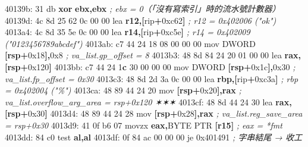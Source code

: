 \documentclass[10pt,a4paper]{article}
\newenvironment{Shaded}{\begin{snugshade}}{\end{snugshade}}
\newcommand{\BaseNTok}[1]{\textcolor[rgb]{0.00,0.00,0.81}{#1}}
\newcommand{\BuiltInTok}[1]{#1}
\newcommand{\CommentTok}[1]{\textcolor[rgb]{0.56,0.35,0.01}{\textit{#1}}}
\newcommand{\DataTypeTok}[1]{\textcolor[rgb]{0.13,0.29,0.53}{#1}}
\newcommand{\DecValTok}[1]{\textcolor[rgb]{0.00,0.00,0.81}{#1}}
\newcommand{\ErrorTok}[1]{\textcolor[rgb]{0.64,0.00,0.00}{\textbf{#1}}}
\newcommand{\KeywordTok}[1]{\textcolor[rgb]{0.13,0.29,0.53}{\textbf{#1}}}
\newcommand{\NormalTok}[1]{#1}
\newcommand{\OperatorTok}[1]{\textcolor[rgb]{0.81,0.36,0.00}{\textbf{#1}}}
\renewenvironment{Shaded}{%
  \def\FrameCommand{\fboxsep=3.2pt\colorbox{shadecolor}}%
  \MakeFramed{\advance\hsize-\width\FrameRestore\small}%
}{%
  \endMakeFramed
}
\begin{document}
\begin{Shaded}
\begin{Highlighting}[]
\NormalTok{  40139b: 31 }\DataTypeTok{db}              \OperatorTok{xor}  \KeywordTok{ebx}\OperatorTok{,}\KeywordTok{ebx}        \CommentTok{; ebx = 0（「沒有寫索引」時的流水號計數器）}
\NormalTok{  40139d: 4c 8d 25 62 0c 00 00  }\BuiltInTok{lea} \KeywordTok{r12}\OperatorTok{,[}\NormalTok{rip}\OperatorTok{+}\BaseNTok{0xc62}\OperatorTok{]}  \CommentTok{; r12 = 0x402006 ("ok")}
\NormalTok{  4013a4: 4c 8d 35 5e 0c 00 00  }\BuiltInTok{lea} \KeywordTok{r14}\OperatorTok{,[}\NormalTok{rip}\OperatorTok{+}\BaseNTok{0xc5e}\OperatorTok{]}  \CommentTok{; r14 = 0x402009 ("0123456789abcdef")}
\NormalTok{  4013ab: c7 }\DecValTok{44} \DecValTok{24} \DecValTok{18} \DecValTok{08} \DecValTok{00} \DecValTok{00} \DecValTok{00}\NormalTok{  mov }\DataTypeTok{DWORD} \OperatorTok{[}\KeywordTok{rsp}\OperatorTok{+}\BaseNTok{0x18}\OperatorTok{],}\BaseNTok{0x8}   \CommentTok{; va\_list.gp\_offset   = 8}
\NormalTok{  4013b3: 48 8d 84 24 20 01 00 00  }\BuiltInTok{lea} \KeywordTok{rax}\OperatorTok{,[}\KeywordTok{rsp}\OperatorTok{+}\BaseNTok{0x120}\OperatorTok{]}
\NormalTok{  4013bb: c7 }\DecValTok{44} \DecValTok{24} \DecValTok{1}\ErrorTok{c} \DecValTok{30} \DecValTok{00} \DecValTok{00} \DecValTok{00}\NormalTok{  mov }\DataTypeTok{DWORD} \OperatorTok{[}\KeywordTok{rsp}\OperatorTok{+}\BaseNTok{0x1c}\OperatorTok{],}\BaseNTok{0x30}  \CommentTok{; va\_list.fp\_offset   = 0x30}
\NormalTok{  4013c3: 48 8d 2d 3a 0c 00 00  }\BuiltInTok{lea} \KeywordTok{rbp}\OperatorTok{,[}\NormalTok{rip}\OperatorTok{+}\BaseNTok{0xc3a}\OperatorTok{]}  \CommentTok{; rbp = 0x402004 ("\%")}
\NormalTok{  4013ca: 48 89 44 24 20     }\BuiltInTok{mov}  \OperatorTok{[}\KeywordTok{rsp}\OperatorTok{+}\BaseNTok{0x20}\OperatorTok{],}\KeywordTok{rax}  \CommentTok{; va\_list.overflow\_arg\_area = rsp+0x120  ✶✶✶}
\NormalTok{  4013cf: 48 8d 44 24 30     }\BuiltInTok{lea}  \KeywordTok{rax}\OperatorTok{,[}\KeywordTok{rsp}\OperatorTok{+}\BaseNTok{0x30}\OperatorTok{]}
\NormalTok{  4013d4: 48 89 44 24 28     }\BuiltInTok{mov}  \OperatorTok{[}\KeywordTok{rsp}\OperatorTok{+}\BaseNTok{0x28}\OperatorTok{],}\KeywordTok{rax}  \CommentTok{; va\_list.reg\_save\_area     = rsp+0x30}
\NormalTok{  4013d9: 41 0f b6 }\DecValTok{07}\NormalTok{        movzx }\KeywordTok{eax}\OperatorTok{,}\DataTypeTok{BYTE} \DataTypeTok{PTR} \OperatorTok{[}\KeywordTok{r15}\OperatorTok{]}   \CommentTok{; eax = *fmt}
\NormalTok{  4013dd: 84 c0              test }\KeywordTok{al}\OperatorTok{,}\KeywordTok{al}
\NormalTok{  4013df: 0f 84 ac }\DecValTok{00} \DecValTok{00} \DecValTok{00}\NormalTok{  je   }\BaseNTok{0x401491}        \CommentTok{; 字串結尾 → 收工}
\end{Highlighting}
\end{Shaded}
\end{document}
